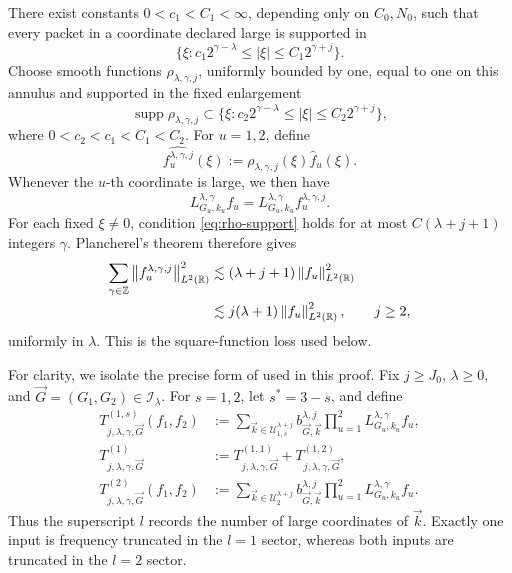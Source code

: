\documentclass[11pt]{amsart}
\theoremstyle{remark}
\numberwithin{equation}{section}
\newcommand{\R}{\mathbb R}
\newcommand{\cI}{\mathcal I}
\newcommand{\cU}{\mathcal U}
\newcommand{\norm}[1]{\left\lVert #1\right\rVert}
\newcommand{\supp}{\operatorname{supp}}
\begin{document}
	There exist constants \(0<c_1<C_1<\infty\), depending only on
	\(C_0,N_0\), such that every packet in a coordinate declared large is
	supported in
	\[
	\{\xi:c_1 2^{\gamma-\lambda}\le |\xi|
	\le C_1 2^{\gamma+j}\}.
	\]
	Choose smooth functions \(\rho_{\lambda,\gamma,j}\), uniformly bounded by
	one, equal to one on this annulus and supported in the fixed enlargement
	\begin{equation}\label{eq:rho-support}
		\supp\rho_{\lambda,\gamma,j}
		\subset
		\{\xi:c_2 2^{\gamma-\lambda}\le |\xi|
		\le C_2 2^{\gamma+j}\},
	\end{equation}
	where \(0<c_2<c_1<C_1<C_2\). For \(u=1,2\), define
	\begin{equation}\label{eq:f-lambda-gamma-j}
		\widehat{f_u^{\lambda,\gamma,j}}(\xi)
		:=\rho_{\lambda,\gamma,j}(\xi)\widehat f_u(\xi).
	\end{equation}
	Whenever the \(u\)-th coordinate is large, we then have
	\begin{equation}\label{eq:L-input-truncation}
		L_{G_u,k_u}^{\lambda,\gamma}f_u
		=L_{G_u,k_u}^{\lambda,\gamma}f_u^{\lambda,\gamma,j}.
	\end{equation}
	For each fixed \(\xi\ne0\), condition \eqref{eq:rho-support} holds for at
	most \(C(\lambda+j+1)\) integers \(\gamma\). Plancherel's theorem therefore
	gives
	\begin{align}
		\sum_{\gamma\in\mathbb Z}
		\norm{f_u^{\lambda,\gamma,j}}_{L^2(\R)}^2
		&\lesssim(\lambda+j+1)\norm{f_u}_{L^2(\R)}^2\notag\\
		&\lesssim j(\lambda+1)\norm{f_u}_{L^2(\R)}^2,
		\qquad j\ge2,
		\label{eq:f-square-gamma}
	\end{align}
	uniformly in \(\lambda\).  This is the square-function loss used below.
	
	For clarity, we isolate the precise form of
	\cite[Proposition~2.4]{GrafakosHeHonzikPark2023} used in this proof.
	Fix \(j\ge J_0\), \(\lambda\ge0\), and
	\(\vec G=(G_1,G_2)\in\cI_\lambda\).  For \(s=1,2\), let
	\(s^\ast=3-s\), and define
	\begin{align*}
		T_{j,\lambda,\gamma,\vec G}^{(1,s)}(f_1,f_2)
		&:=
		\sum_{\vec k\in\cU_{1,s}^{\lambda+j}}
		b_{\vec G,\vec k}^{\lambda,j}
		\prod_{u=1}^2L_{G_u,k_u}^{\lambda,\gamma}f_u,\\
		T_{j,\lambda,\gamma,\vec G}^{(1)}
		&:=
		T_{j,\lambda,\gamma,\vec G}^{(1,1)}
		+T_{j,\lambda,\gamma,\vec G}^{(1,2)},\\
		T_{j,\lambda,\gamma,\vec G}^{(2)}(f_1,f_2)
		&:=
		\sum_{\vec k\in\cU_2^{\lambda+j}}
		b_{\vec G,\vec k}^{\lambda,j}
		\prod_{u=1}^2L_{G_u,k_u}^{\lambda,\gamma}f_u.
	\end{align*}
	Thus the superscript \(l\) records the number of large coordinates of
	\(\vec k\). Exactly one input is frequency truncated in the \(l=1\)
	sector, whereas both inputs are truncated in the \(l=2\) sector.
	
\end{document}
